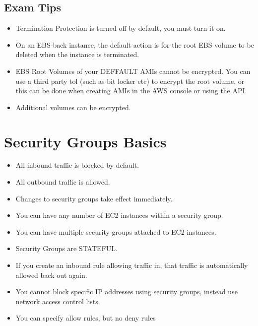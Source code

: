\documentclass{article}
\begin{document}
\subsection{Exam Tips}
\begin{itemize}
\item
Termination Protection is turned off by default, you must turn it on.

\item
On an EBS-back instance, the default action is for the root EBS volume to be deleted when the instance is terminated.

\item
EBS Root Volumes of your DEFFAULT AMIs cannot be encrypted. You can use a third party tol (such as bit locker etc) to encrypt the root volume, or this can be done when creating AMIs in the AWS console or using the API.

\item
Additional volumes can be encrypted.
\end{itemize}

\section{Security Groups Basics}
\begin{itemize}
\item
All inbound traffic is blocked by default.

\item
All outbound traffic is allowed.

\item
Changes to security groups take effect immediately.

\item
You can have any number of EC2 instances within a security group.

\item
You can have multiple security groups attached to EC2 instances.

\item
Security Groups are STATEFUL.

\item
If you create an inbound rule allowing traffic in, that traffic is automatically allowed back out again.

\item
You cannot block specific IP addresses using security groups, instead use network access control lists.

\item
You can specify allow rules, but no deny rules

\end{itemize}
\end{document}
